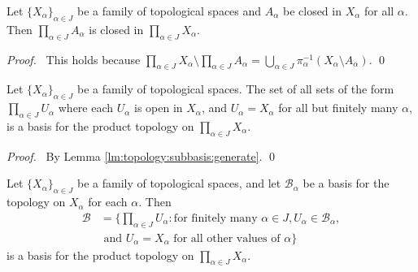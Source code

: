 \begin{lm}
  Let $\{ X_\alpha \}_{\alpha \in J}$ be a family of topological spaces and
  $A_\alpha$ be closed in $X_\alpha$ for all $\alpha$. Then $\prod_{\alpha
    \in J} A_\alpha$ is closed in $\prod_{\alpha \in J} X_\alpha$.
\end{lm}

\begin{proof}
  \pf\ This holds because $\prod_{\alpha \in J} X_\alpha \setminus
  \prod_{\alpha \in J} A_\alpha = \bigcup_{\alpha \in J}
  \pi_\alpha^{-1}(X_\alpha \setminus A_\alpha)$. \qed
\end{proof}

\begin{thm}
  \label{thm:topology:product:basis}
  Let $\{ X_\alpha \}_{\alpha \in J}$ be a family of topological spaces.
  The set of all sets of the form $\prod_{\alpha \in J} U_\alpha$ where each
  $U_\alpha$ is open in $X_\alpha$, and $U_\alpha = X_\alpha$ for all but
  finitely many $\alpha$, is a basis for the product topology on
  $\prod_{\alpha
    \in J} X_\alpha$.
\end{thm}

\begin{proof}
  \pf\ By Lemma \ref{lm:topology:subbasis:generate}. \qed
\end{proof}

\begin{thm}
  Let $\{X_\alpha\}_{\alpha \in J}$ be a family of topological spaces, and
  let $\mathcal{B}_\alpha$ be a basis for the topology on $X_\alpha$ for each
  $\alpha$. Then
  \begin{align*}
    \mathcal{B} & = \{ \prod_{\alpha \in J} U_\alpha : \text{for finitely
      many
    } \alpha \in J, U_\alpha \in \mathcal{B}_\alpha,  \\
    &  \text{ and } U_\alpha =
    X_\alpha \text{ for all other values of } \alpha \}
  \end{align*}
  is a basis for the product topology on $\prod_{\alpha \in J} X_\alpha$.
\end{thm}

